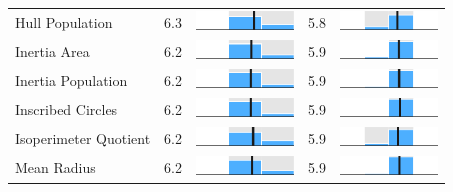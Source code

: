\begin{table}
\begin{tabular}{l rm{7em} rm{7em}}
Hull Population        &   6.3 &       \includegraphics[width=7em]{mini_hist/MD_2008_hull_p} &   5.8 &       \includegraphics[width=7em]{mini_hist/MD_2016_hull_p} \\
Inertia Area           &   6.2 &    \includegraphics[width=7em]{mini_hist/MD_2008_inertia_a} &   5.9 &    \includegraphics[width=7em]{mini_hist/MD_2016_inertia_a} \\
Inertia Population     &   6.2 &    \includegraphics[width=7em]{mini_hist/MD_2008_inertia_p} &   5.9 &    \includegraphics[width=7em]{mini_hist/MD_2016_inertia_p} \\
Inscribed Circles      &   6.2 &    \includegraphics[width=7em]{mini_hist/MD_2008_ehrenburg} &   5.9 &    \includegraphics[width=7em]{mini_hist/MD_2016_ehrenburg} \\
Isoperimeter Quotient  &   6.2 &       \includegraphics[width=7em]{mini_hist/MD_2008_polsby} &   5.9 &       \includegraphics[width=7em]{mini_hist/MD_2016_polsby} \\
Mean Radius            &   6.2 &  \includegraphics[width=7em]{mini_hist/MD_2008_mean_radius} &   5.9 &  \includegraphics[width=7em]{mini_hist/MD_2016_mean_radius} \\

\end{tabular}
\end{table}

